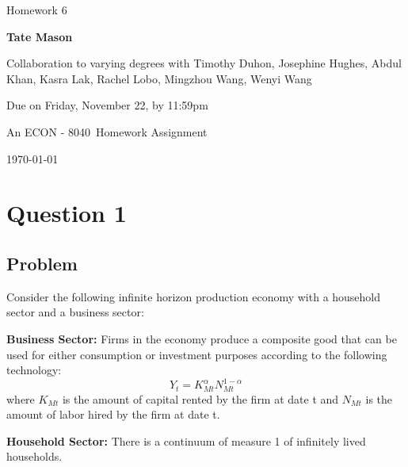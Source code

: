 \documentclass[10pt, a4paper]{article}
\newcommand\course{ECON - 8040}
\newcommand\hwnumber{6}
\newcommand\Information{Tate Mason}
\begin{document}
  \begin{titlepage}
    \begin{center}
      \vspace*{3cm}
            
      \vspace{1cm}
      \huge
      Homework \hwnumber
            
      \vspace{1.5cm}
      \Large
            
      \textbf{\Information}
            
      \vfill
      
      Collaboration to varying degrees with Timothy Duhon, Josephine Hughes, Abdul Khan, Kasra Lak, Rachel Lobo, Mingzhou Wang, Wenyi Wang
      \vspace{1cm}
      
      Due on Friday, November 22, by 11:59pm

      \vspace{1cm}

      An \course \ Homework Assignment
            
      \vspace{1cm}
      \Large
      
      \today
            
    \end{center}
  \end{titlepage}
\section*{Question 1}
  \subsection*{Problem}
    Consider the following infinite horizon production economy with a household sector and a business sector:

    \textbf{Business Sector:} Firms in the economy produce a composite good that can be used for either consumption or investment purposes according to the following technology:
    \begin{equation*}
    Y_t = K_{Mt}^\alpha N_{Mt}^{1-\alpha}
    \end{equation*}
    where $K_{Mt}$ is the amount of capital rented by the firm at date t and $N_{Mt}$ is the amount of labor hired by the firm at date t.

    \textbf{Household Sector:} There is a continuum of measure 1 of infinitely lived households.
\end{document}
